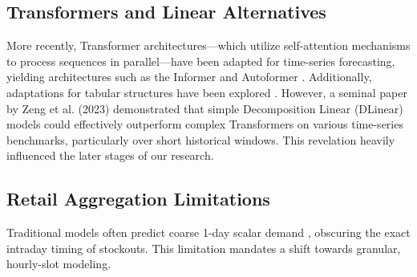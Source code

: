 \subsection{Transformers and Linear Alternatives}
More recently, Transformer architectures—which utilize self-attention mechanisms to process sequences in parallel—have been adapted for time-series forecasting, yielding architectures such as the Informer \cite{zhou2021informer} and Autoformer \cite{wu2021autoformer}. Additionally, adaptations for tabular structures have been explored \cite{gorishniy2021revisiting}. However, a seminal paper by Zeng et al. (2023) \cite{zeng2023dlinear} demonstrated that simple Decomposition Linear (DLinear) models could effectively outperform complex Transformers on various time-series benchmarks, particularly over short historical windows. This revelation heavily influenced the later stages of our research.

\subsection{Retail Aggregation Limitations}
Traditional models often predict coarse 1-day scalar demand \cite{syntetos2016}, obscuring the exact intraday timing of stockouts. This limitation mandates a shift towards granular, hourly-slot modeling.
